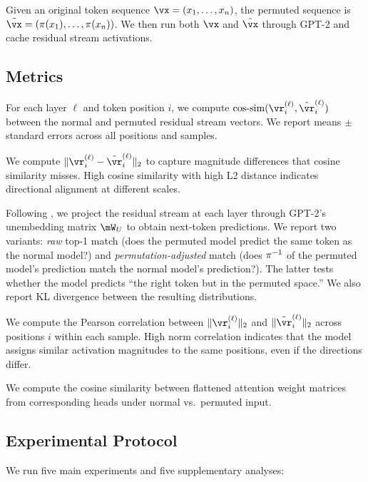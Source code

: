 Given an original token sequence $\vx = (x_1, \ldots, x_n)$, the permuted sequence is $\tilde{\vx} = (\perm(x_1), \ldots, \perm(x_n))$. We then run both $\vx$ and $\tilde{\vx}$ through GPT-2 and cache residual stream activations.

\subsection{Metrics}
\label{sec:metrics}

For each layer $\ell$ and token position $i$, we compute $\cossim(\rs{\ell}_i, \rsperm{\ell}_i)$ between the normal and permuted residual stream vectors. We report means $\pm$ standard errors across all positions and samples.

We compute $\|\rs{\ell}_i - \rsperm{\ell}_i\|_2$ to capture magnitude differences that cosine similarity misses. High cosine similarity with high L2 distance indicates directional alignment at different scales.

Following \citet{nostalgebraist2020logitlens}, we project the residual stream at each layer through GPT-2's unembedding matrix $\mW_U$ to obtain next-token predictions. We report two variants: \emph{raw} top-1 match (does the permuted model predict the same token as the normal model?) and \emph{permutation-adjusted} match (does $\pi^{-1}$ of the permuted model's prediction match the normal model's prediction?). The latter tests whether the model predicts ``the right token but in the permuted space.'' We also report KL divergence between the resulting distributions.

We compute the Pearson correlation between $\|\rs{\ell}_i\|_2$ and $\|\rsperm{\ell}_i\|_2$ across positions $i$ within each sample. High norm correlation indicates that the model assigns similar activation magnitudes to the same positions, even if the directions differ.

We compute the cosine similarity between flattened attention weight matrices from corresponding heads under normal vs.\ permuted input.

\subsection{Experimental Protocol}

We run five main experiments and five supplementary analyses:

